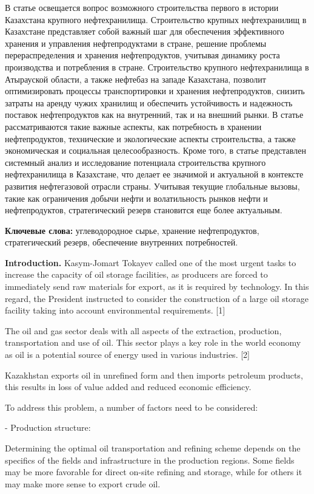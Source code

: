 В статье освещается вопрос возможного строительства первого в истории
Казахстана крупного нефтехранилища. Строительство крупных нефтехранилищ
в Казахстане представляет собой важный шаг для обеспечения эффективного
хранения и управления нефтепродуктами в стране, решение проблемы
перераспределения и хранения нефтепродуктов, учитывая динамику роста
производства и потребления в стране. Строительство крупного
нефтехранилища в Атырауской области, а также нефтебаз на западе
Казахстана, позволит оптимизировать процессы транспортировки и хранения
нефтепродуктов, снизить затраты на аренду чужих хранилищ и обеспечить
устойчивость и надежность поставок нефтепродуктов как на внутренний, так
и на внешний рынки. В статье рассматриваются такие важные аспекты, как
потребность в хранении нефтепродуктов, технические и экологические
аспекты строительства, а также экономическая и социальная
целесообразность. Кроме того, в статье представлен системный анализ и
исследование потенциала строительства крупного нефтехранилища в
Казахстане, что делает ее значимой и актуальной в контексте развития
нефтегазовой отрасли страны. Учитывая текущие глобальные вызовы, такие
как ограничения добычи нефти и волатильность рынков нефти и
нефтепродуктов, стратегический резерв становится еще более актуальным.

{\bfseries Ключевые слова:} углеводородное сырье, хранение нефтепродуктов,
стратегический резерв, обеспечение внутренних потребностей.

{\bfseries Introduction.} Kasym-Jomart Tokayev called one of the most
urgent tasks to increase the capacity of oil storage facilities, as
producers are forced to immediately send raw materials for export, as it
is required by technology. In this regard, the President instructed to
consider the construction of a large oil storage facility taking into
account environmental requirements. {[}1{]}

The oil and gas sector deals with all aspects of the extraction,
production, transportation and use of oil. This sector plays a key role
in the world economy as oil is a potential source of energy used in
various industries. {[}2{]}

Kazakhstan exports oil in unrefined form and then imports petroleum
products, this results in loss of value added and reduced economic
efficiency.

To address this problem, a number of factors need to be considered:

- Production structure:

Determining the optimal oil transportation and refining scheme depends
on the specifics of the fields and infrastructure in the production
regions. Some fields may be more favorable for direct on-site refining
and storage, while for others it may make more sense to export crude
oil.

